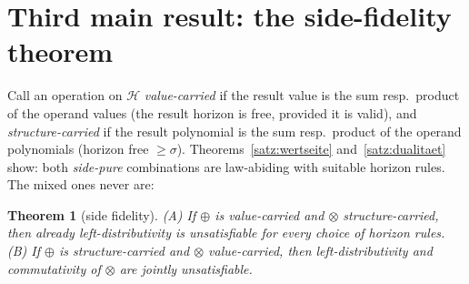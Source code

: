 \documentclass[11pt]{article}
\newtheorem{satz}{Theorem}[section]
\theoremstyle{definition}
\theoremstyle{remark}
\newcommand{\Hori}{\mathcal H}
\begin{document}
\section{Third main result: the side-fidelity theorem}

Call an operation on $\Hori$ \emph{value-carried} if the result
value is the sum resp.\ product of the operand values (the result
horizon is free, provided it is valid), and
\emph{structure-carried} if the result polynomial is the sum resp.\
product of the operand polynomials (horizon free $\ge\sigma$).
Theorems~\ref{satz:wertseite} and~\ref{satz:dualitaet} show: both
\emph{side-pure} combinations are law-abiding with suitable horizon
rules. The mixed ones never are:

\begin{satz}[side fidelity]\label{satz:seitentreue}
\emph{(A)} If $\oplus$ is value-carried and $\otimes$
structure-carried, then already left-distributivity is
unsatisfiable for every choice of horizon rules.
\emph{(B)} If $\oplus$ is structure-carried and $\otimes$
value-carried, then left-distributivity and commutativity of
$\otimes$ are jointly unsatisfiable.
\end{satz}
\end{document}
